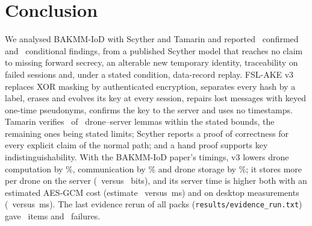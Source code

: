 \section{Conclusion}\label{sec:conclusion}

We analysed BAKMM-IoD with Scyther and Tamarin and reported \NumFlawsConfirmed\ confirmed and \NumFlawsConditional\
conditional findings, from a published Scyther model that reaches no claim to missing forward secrecy, an alterable new
temporary identity, traceability on failed sessions and, under a stated condition, data-record replay. FSL-AKE v3 replaces XOR
masking by authenticated encryption, separates every hash by a label, erases and evolves its key at every session, repairs lost
messages with keyed one-time pseudonyms, confirms the key to the server and uses no timestamps. Tamarin verifies
\NumVthreeVerified\ of \NumVthreeLemmas\ drone--server lemmas within the stated bounds, the remaining ones being stated limits;
Scyther reports a proof of correctness for every explicit claim of the normal path; and a hand proof supports key
indistinguishability. With the BAKMM-IoD paper's timings, v3 lowers drone computation by \PctDrone\%, communication by
\PctBits\% and drone storage by \PctStoreDrone\%; it stores more per drone on the server (\StoreServerVthree\ versus
\StoreServerBakmm\ bits), and its server time is higher both with an estimated AES-GCM cost (estimate \CostServerWithAEAD\
versus \CostServerBakmm\,ms) and on desktop measurements (\MeasServerVthree\ versus \MeasServerBakmm\,ms). The last evidence
rerun of all packs (\texttt{results/evidence\_run.txt}) gave \EvItems\ items and \EvFail\ failures.
